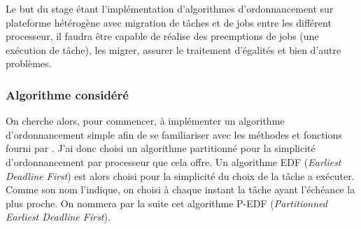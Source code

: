 Le but du stage étant l'implémentation d'algorithmes d'ordonnancement sur plateforme hétérogène avec migration de tâches et de jobs entre les différent \gls{processeur}, il faudra être capable de réalise des \glspl{preemption} de jobs (une exécution de tâche), les migrer, assurer le traitement d'égalités et bien d'autre problèmes.


\subsubsection{Algorithme considéré}

On cherche alors, pour commencer, à implémenter un algorithme d'ordonnancement simple afin de se familiariser avec les méthodes et fonctions fourni par \litmus. J'ai donc choisi un algorithme partitionné pour la simplicité d'ordonnancement par \gls{processeur} que cela offre. Un algorithme EDF (\textit{Earliest Deadline First}) est alors choisi pour la simplicité du choix de la tâche a exécuter. Comme son nom l'indique, on choisi à chaque instant la tâche ayant l'échéance la plus proche. On nommera par la suite cet algorithme P-EDF (\textit{Partitionned Earliest Deadline First}).

